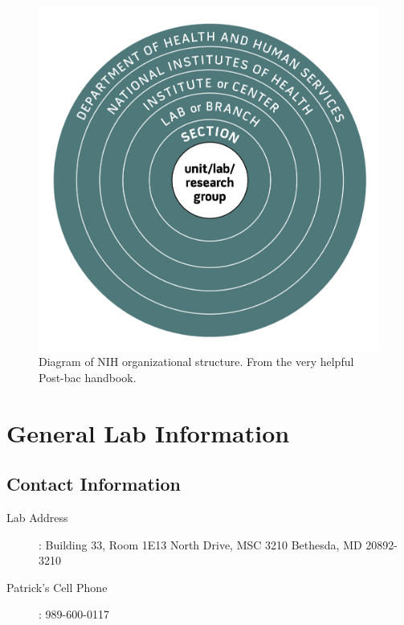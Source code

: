 \documentclass[10pt, a4paper, twocolumn]{article} %
\begin{document}
\begin{figure}
	\includegraphics[width=\linewidth]{unitlab.png} %
	\caption{Diagram of NIH organizational structure. From the very helpful Post-bac handbook. \citep{}} %
	\label{unit_organization} %
\end{figure}

\section{General Lab Information}
\subsection{Contact Information}
\begin{description}
\item [Lab Address]: \newline Building 33, Room 1E13  North Drive, MSC 3210 \newline Bethesda, MD 20892-3210
\item [Patrick's Cell Phone]: 989-600-0117
\end{description}
\end{document}
